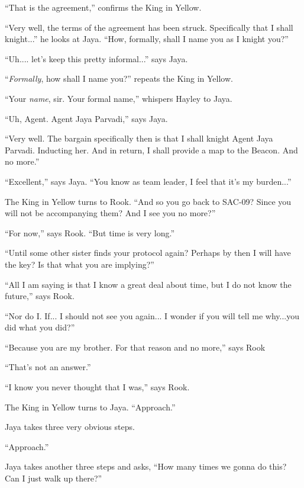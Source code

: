 ``That is the agreement,'' confirms the King in Yellow.



``Very well, the terms of the agreement has been struck.  Specifically that I shall knight...'' he looks at Jaya.  ``How, formally, shall I name you as I knight you?''

``Uh.... let's keep this pretty informal...'' says Jaya.

``\textit{Formally}, how shall I name you?'' repeats the King in Yellow.

``Your \textit{name}, sir.  Your formal name,'' whispers Hayley to Jaya.

``Uh, Agent.  Agent Jaya Parvadi,'' says Jaya.

``Very well. The bargain specifically then is that I shall knight Agent Jaya Parvadi.  Inducting her.  And in return, I shall provide a map to the Beacon.  And no more.''

``Excellent,'' says Jaya. ``You know as team leader, I feel that it's my burden...''



The King in Yellow turns to Rook. ``And so you go back to SAC-09?  Since you will not be accompanying them?  And I see you no more?''

``For now,'' says Rook.  ``But time is very long.''

``Until some other sister finds your protocol again?  Perhaps by then I will have the key?  Is that what you are implying?''

``All I am saying is that I know a great deal about time, but I do not know the future,'' says Rook.

``Nor do I.  If... I should not see you again... I wonder if you will tell me why...you did what you did?''

``Because you are my brother.  For that reason and no more,'' says Rook

``That's not an answer.''

``I know you never thought that I was,'' says Rook.





The King in Yellow turns to Jaya.  ``Approach.''

Jaya takes three very obvious steps.

``Approach.''

Jaya takes another three steps and asks, ``How many times we gonna do this?  Can I just walk up there?''

